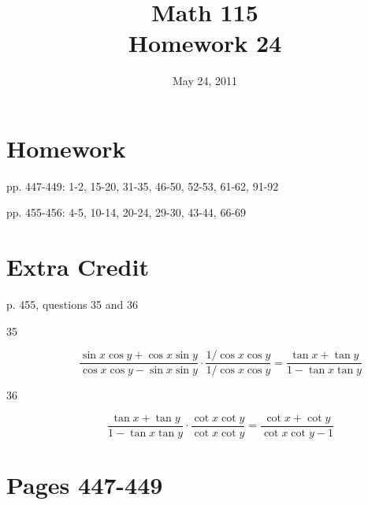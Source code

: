 \documentclass[fleqn,addpoints]{exam}
\title{Math 115 \\ Homework 24}
\date{May 24, 2011}
\begin{document}
\maketitle




\section{Homework}
\begin{itemize*}
  \item pp. 447-449: 1-2, 15-20, 31-35, 46-50, 52-53, 61-62, 91-92
  \item pp. 455-456: 4-5, 10-14, 20-24, 29-30, 43-44, 66-69
\end{itemize*}


\section{Extra Credit}
p. 455, questions 35 and 36

\begin{description}
\item[35]
\[
  \frac{\sin x \cos y + \cos x \sin y}{\cos x \cos y - \sin x \sin y} 
    \cdot \frac{1/\cos x \cos y}{1/\cos x \cos y} = \frac{\tan x + \tan y}{1 - \tan x \tan y}
\]

\item[36]
\[
  \frac{\tan x + \tan y}{1 - \tan x \tan y} \cdot \frac{\cot x \cot y}{\cot x \cot y}
    = \frac{\cot x + \cot y}{\cot x \cot y - 1}
\]

\end{description}

\ifprintanswers
\section{Pages 447-449}
\end{document}
